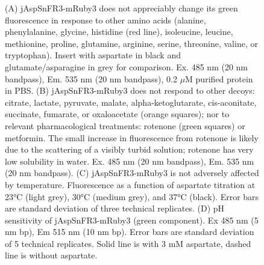 \begin{figure}[ht]
    \centering
    \caption[Decoy, temperature and pH sensitivity.]{
    (A) jAspSnFR3-mRuby3 does not appreciably change its green fluorescence in response to other amino acids (alanine, phenylalanine, glycine, histidine (red line), isoleucine, leucine, methionine, proline, glutamine, arginine, serine, threonine, valine, or tryptophan).
    Insert with aspartate in black and glutamate/asparagine in grey for comparison.
    Ex. 485 nm (20 nm bandpass), Em. 535 nm (20 nm bandpass), 0.2 $\mu$M purified protein in PBS.
    (B) jAspSnFR3-mRuby3 does not respond to other decoys: citrate, lactate, pyruvate, malate, alpha-ketoglutarate, cis-aconitate, succinate, fumarate, or oxaloacetate (orange squares); nor to relevant pharmacological treatments: rotenone (green squares) or metformin.
    The small increase in fluorescence from rotenone is likely due to the scattering of a visibly turbid solution; rotenone has very low solubility in water.
    Ex. 485 nm (20 nm bandpass), Em. 535 nm (20 nm bandpass).
    (C) jAspSnFR3-mRuby3 is not adversely affected by temperature.
    Fluorescence as a function of aspartate titration at 23°C (light grey), 30°C (medium grey), and 37°C (black).
    Error bars are standard deviation of three technical replicates.
    (D) pH sensitivity of jAspSnFR3-mRuby3 (green component).
    Ex 485 nm (5 nm bp), Em 515 nm (10 nm bp).
    Error bars are standard deviation of 5 technical replicates.
    Solid line is with 3 mM aspartate, dashed line is without aspartate.
    }
    \label{ch3:figsupp:f1S2}
\end{figure}

